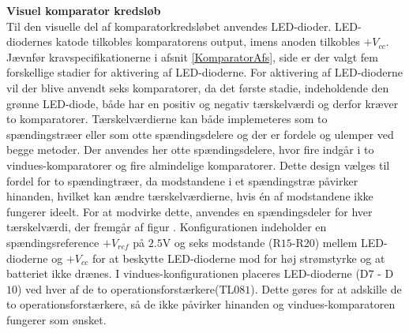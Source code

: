 \noindent\textbf{Visuel komparator kredsløb} \\
Til den visuelle del af komparatorkredsløbet anvendes LED-dioder. LED-diodernes katode tilkobles komparatorens output, imens anoden tilkobles $+V_{cc}$. Jævnfør kravspecifikationerne i afsnit \ref{KomparatorAfs}, side \pageref{KomparatorAfs} er der valgt fem forskellige stadier for aktivering af LED-dioderne. For aktivering af LED-dioderne vil der blive anvendt seks komparatorer, da det første stadie, indeholdende den grønne LED-diode, både har en positiv og negativ tærskelværdi og derfor kræver to komparatorer. Tærskelværdierne kan både implemeteres som to spændingstræer eller som otte spændingsdelere og der er fordele og ulemper ved begge metoder. Der anvendes her otte spændingsdelere, hvor fire indgår i to vindues-komparatorer og fire almindelige komparatorer. Dette design vælges til fordel for to spændingtræer, da modstandene i et spændingstræ påvirker hinanden, hvilket kan ændre tærskelværdierne, hvis én af modstandene ikke fungerer ideelt. For at modvirke dette, anvendes en spændingsdeler for hver tærskelværdi, der fremgår af figur . Konfigurationen indeholder en spændingsreference $+V_{ref}$ på $2.5$V og seks modstande (R$15$-R$20$) mellem LED-dioderne og $+V_{cc}$ for at beskytte LED-dioderne mod for høj strømstyrke og at batteriet ikke drænes. I vindues-konfigurationen placeres LED-dioderne (D$7$ - D$10$) ved hver af de to operationsforstærkere(TL$081$). Dette gøres for at adskille de to operationsforstærkere, så de ikke påvirker hinanden og vindues-komparatoren fungerer som ønsket.  
